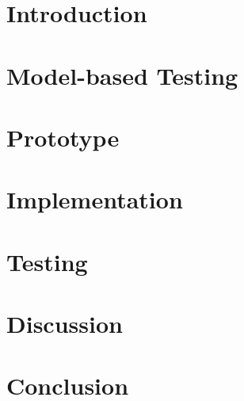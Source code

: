 \documentclass[a4paper, 12pt,titlepage]{dithesis}
\begin{document}
\setlongtables
\begin{longtable}[l]{p{3cm}p{}}



\end{longtable}
\setcounter{table}{0}

\chapter{Introduction}
\sivunumerot
\thispagestyle{empty}

\chapter{Model-based Testing}


\chapter{Prototype}

\chapter{Implementation}

\chapter{Testing}

\chapter{Discussion}

\chapter{Conclusion}



\end{document}
